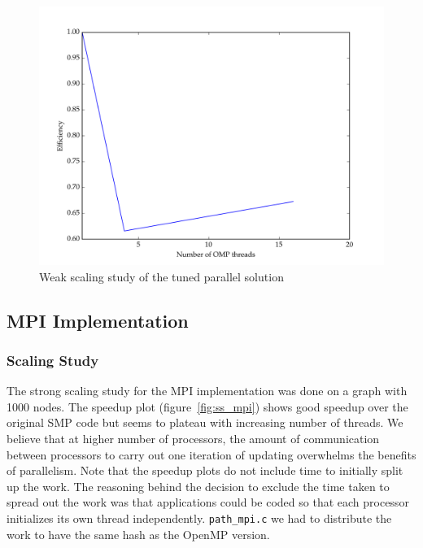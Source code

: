 \documentclass[11pt]{article}
\begin{document}
\begin{figure}[H]
\centering
\includegraphics[scale=0.5]{./scaling_studies/weak_scaling_eric.png}
\caption{Weak scaling study of the tuned parallel solution}
\label{fig:ws_eric}
\end{figure}

\subsection{MPI Implementation}

\subsubsection{Scaling Study}

The strong scaling study for the MPI implementation was done on a graph with 1000 nodes. The speedup plot (figure~\ref{fig:ss_mpi}) shows good speedup over the original SMP code but seems to plateau with increasing number of threads. We believe that at higher number of processors, the amount of communication between processors to carry out one iteration of updating overwhelms the benefits of parallelism. Note that the speedup plots do not include time to initially split up the work. The reasoning behind the decision to exclude the time taken to spread out the work was that applications could be coded so that each processor initializes its own thread independently. \texttt{path\_mpi.c} we had to distribute the work to have the same hash as the OpenMP version. 
\end{document}
